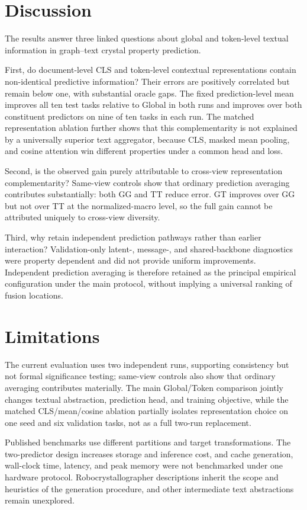 \documentclass[a4paper,fleqn]{cas-sc}
\begin{document}
\section{Discussion}
The results answer three linked questions about global and token-level textual information in graph--text crystal property prediction.

First, do document-level CLS and token-level contextual representations contain non-identical predictive information? Their errors are positively correlated but remain below one, with substantial oracle gaps. The fixed prediction-level mean improves all ten test tasks relative to Global in both runs and improves over both constituent predictors on nine of ten tasks in each run. The matched representation ablation further shows that this complementarity is not explained by a universally superior text aggregator, because CLS, masked mean pooling, and cosine attention win different properties under a common head and loss.

Second, is the observed gain purely attributable to cross-view representation complementarity? Same-view controls show that ordinary prediction averaging contributes substantially: both GG and TT reduce error. GT improves over GG but not over TT at the normalized-macro level, so the full gain cannot be attributed uniquely to cross-view diversity.

Third, why retain independent prediction pathways rather than earlier interaction? Validation-only latent-, message-, and shared-backbone diagnostics were property dependent and did not provide uniform improvements. Independent prediction averaging is therefore retained as the principal empirical configuration under the main protocol, without implying a universal ranking of fusion locations.

\section{Limitations}
The current evaluation uses two independent runs, supporting consistency but not formal significance testing; same-view controls also show that ordinary averaging contributes materially. The main Global/Token comparison jointly changes textual abstraction, prediction head, and training objective, while the matched CLS/mean/cosine ablation partially isolates representation choice on one seed and six validation tasks, not as a full two-run replacement.

Published benchmarks use different partitions and target transformations. The two-predictor design increases storage and inference cost, and cache generation, wall-clock time, latency, and peak memory were not benchmarked under one hardware protocol. Robocrystallographer descriptions inherit the scope and heuristics of the generation procedure, and other intermediate text abstractions remain unexplored.
\end{document}
